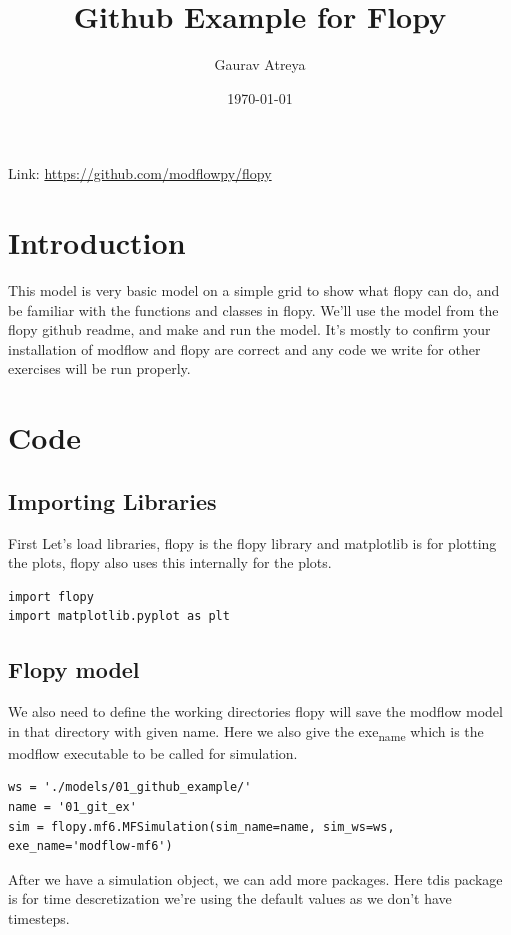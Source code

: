 \documentclass[titlepage,12pt]{unisubmission}
\author{Gaurav Atreya}
\date{\today}
\title{Github Example for Flopy}
\begin{document}
\maketitle
\setcounter{tocdepth}{2}
\tableofcontents

Link: \url{https://github.com/modflowpy/flopy}

\section{Introduction}
\label{sec:org1d47460}
This model is very basic model on a simple grid to show what flopy can do, and be familiar with the functions and classes in flopy. We'll use the model from the flopy github readme, and make and run the model. It's mostly to confirm your installation of modflow and flopy are correct and any code we write for other exercises will be run properly.

\section{Code}
\label{sec:org8b99801}

\subsection{Importing Libraries}
\label{sec:org21e4280}
First Let's load libraries, flopy is the flopy library and matplotlib is for plotting the plots, flopy also uses this internally for the plots.

\begin{verbatim}
import flopy
import matplotlib.pyplot as plt
\end{verbatim}

\subsection{Flopy model}
\label{sec:org71b9e97}
We also need to define the working directories flopy will save the modflow model in that directory with given name. Here we also give the exe\textsubscript{name} which is the modflow executable to be called for simulation.

\begin{verbatim}
ws = './models/01_github_example/'
name = '01_git_ex'
sim = flopy.mf6.MFSimulation(sim_name=name, sim_ws=ws, exe_name='modflow-mf6')
\end{verbatim}


After we have a simulation object, we can add more packages. Here tdis package is for time descretization we're using the default values as we don't have timesteps.
\end{document}
